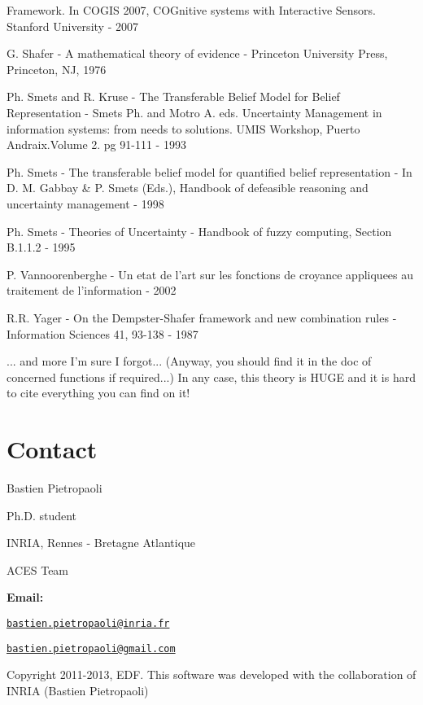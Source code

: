 \begin{DoxyItemize}
Framework. In COGIS 2007, COGnitive systems with Interactive Sensors. Stanford University -\/ 2007 \item G. Shafer -\/ A mathematical theory of evidence -\/ Princeton University Press, Princeton, NJ, 1976 \item Ph. Smets and R. Kruse -\/ The Transferable Belief Model for Belief Representation -\/ Smets Ph. and Motro A. eds. Uncertainty Management in information systems: from needs to solutions. UMIS Workshop, Puerto Andraix.Volume 2. pg 91-\/111 -\/ 1993 \item Ph. Smets -\/ The transferable belief model for quantified belief representation -\/ In D. M. Gabbay \& P. Smets (Eds.), Handbook of defeasible reasoning and uncertainty management -\/ 1998 \item Ph. Smets -\/ Theories of Uncertainty -\/ Handbook of fuzzy computing, Section B.1.1.2 -\/ 1995 \item P. Vannoorenberghe -\/ Un etat de l'art sur les fonctions de croyance appliquees au traitement de l'information -\/ 2002 \item R.R. Yager -\/ On the Dempster-\/Shafer framework and new combination rules -\/ Information Sciences 41, 93-\/138 -\/ 1987 \item ... and more I'm sure I forgot... (Anyway, you should find it in the doc of concerned functions if required...) In any case, this theory is HUGE and it is hard to cite everything you can find on it!\end{DoxyItemize}
\hypertarget{index_contact_sec}{}\section{Contact}\label{index_contact_sec}
Bastien Pietropaoli \par
 Ph.D. student \par
 INRIA, Rennes -\/ Bretagne Atlantique \par
 ACES Team \par


{\bfseries Email:} \par
 \href{mailto:bastien.pietropaoli@inria.fr}{\tt bastien.pietropaoli@inria.fr} \par
 \href{mailto:bastien.pietropaoli@gmail.com}{\tt bastien.pietropaoli@gmail.com} \par


Copyright 2011-\/2013, EDF. This software was developed with the collaboration of INRIA (Bastien Pietropaoli) 